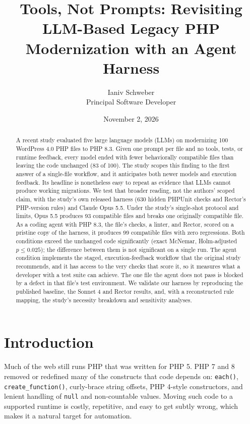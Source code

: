 \documentclass[11pt]{article}
\title{Tools, Not Prompts: Revisiting LLM-Based Legacy PHP Modernization with an Agent Harness}
\author{Ianiv Schweber\\{\normalsize Principal Software Developer}}
\date{November 2, 2026}
\newcommand{\code}[1]{\texttt{#1}}
\begin{document}
\maketitle

\begin{abstract}
A recent study evaluated five large language models (LLMs) on modernizing 100 WordPress 4.0 PHP files to PHP 8.3.
Given one prompt per file and no tools, tests, or runtime feedback, every model ended with fewer behaviorally compatible files than leaving the code unchanged (83 of 100).
The study scopes this finding to the first answer of a single-file workflow, and it anticipates both newer models and execution feedback.
Its headline is nonetheless easy to repeat as evidence that LLMs cannot produce working migrations.
We test that broader reading, not the authors' scoped claim, with the study's own released harness (630 hidden PHPUnit checks and Rector's PHP-version rules) and Claude Opus 5.5.
Under the study's single-shot protocol and limits, Opus 5.5 produces 93 compatible files and breaks one originally compatible file.
As a coding agent with PHP 8.3, the file's checks, a linter, and Rector, scored on a pristine copy of the harness, it produces 99 compatible files with zero regressions.
Both conditions exceed the unchanged code significantly (exact McNemar, Holm-adjusted $p \le 0.025$); the difference between them is not significant on a single run.
The agent condition implements the staged, execution-feedback workflow that the original study recommends, and it has access to the very checks that score it, so it measures what a developer with a test suite can achieve.
The one file the agent does not pass is blocked by a defect in that file's test environment.
We validate our harness by reproducing the published baseline, the Sonnet 4 and Rector results, and, with a reconstructed rule mapping, the study's necessity breakdown and sensitivity analyses.
\end{abstract}

\section{Introduction}

Much of the web still runs PHP that was written for PHP 5.
PHP 7 and 8 removed or redefined many of the constructs that code depends on: \code{each()}, \code{create\_function()}, curly-brace string offsets, PHP 4-style constructors, and lenient handling of \code{null} and non-countable values.
Moving such code to a supported runtime is costly, repetitive, and easy to get subtly wrong, which makes it a natural target for automation.
\end{document}

